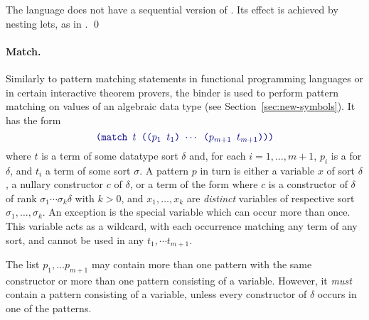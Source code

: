 \begin{remark}
The language does not have a sequential version of .
Its effect is achieved by nesting lets, as in 
.
\qed
\end{remark}

\paragraph{Match.}
Similarly to pattern matching statements in functional programming languages
or in certain interactive theorem provers,
the  binder is used to perform pattern matching on values 
of an algebraic data type (see Section~\ref{sec:new-symbols}).
It has the form
%
\begin{equation} \label{eq:match}
\expr{(match $t$ (($p_1$ $t_1$) $\cdots$ ($p_{m+1}$ $t_{m+1}$)))}
\end{equation}
%
where $t$ is a term of some datatype sort $\delta$ and,
for each $i=1,\ldots,m+1$,
$p_i$ is a  for $\delta$, and $t_i$ a term of some sort $\sigma$.
A pattern $p$ in turn is either a variable $x$ of sort $\delta$, 
a nullary constructor $c$ of $\delta$, 
or a term of the form 
where $c$ is a constructor of $\delta$ of rank
$\sigma_1\cdots\sigma_k\delta$ 
with $k > 0$, and $x_1, \ldots, x_k$ are \emph{distinct} variables 
of respective sort $\sigma_1,\ldots,\sigma_k$.
An exception is the special variable \ter{\_} which can occur
more than once.  This variable acts as a wildcard, with each occurrence
matching any term of any sort, and cannot be used in
any $t_1, \cdots t_{m + 1}$.

The list $p_1,\ldots p_{m+1}$ may contain more than one pattern with the same constructor 
or more than one pattern consisting of a variable.
However, it \emph{must} contain a pattern consisting of a variable, 
unless every constructor of $\delta$ occurs in one of the patterns.



